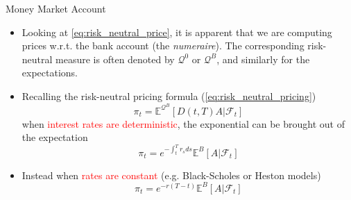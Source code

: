 \documentclass{beamer}
\begin{document}
\begin{frame}{Money Market Account}
\begin{itemize}
	\item<0-> Looking at \cref{eq:risk_neutral_price}, it is apparent that we are computing prices w.r.t. the bank account (the \emph{numeraire}). The corresponding risk-neutral measure is often denoted by $\mathcal{Q}^0$ or $\mathcal{Q}^B$, and similarly for the expectations. 
    \item<2-> Recalling the risk-neutral pricing formula (\cref{eq:risk_neutral_pricing})
    \begin{equation*}
    	\pi_t = \mathbb{E}^{\mathcal{Q}^B}[D(t,T)A|\mathcal{F}_t]
    \end{equation*}
	when \textcolor{red}{interest rates are deterministic}, the exponential can be brought out of the expectation
	\begin{equation*}
		\pi_t = e^{-\int_t^T r_s ds} \mathbb{E}^B\left[A|\mathcal{F}_t\right]
	\end{equation*}
	\item<3-> Instead when \textcolor{red}{rates are constant} (e.g. Black-Scholes or Heston models)
	\begin{equation*}
		\pi_t = e^{-r(T-t)}\mathbb{E}^B\left[A|\mathcal{F}_t\right]
	\end{equation*}
\end{itemize}
\end{frame}
\end{document}
